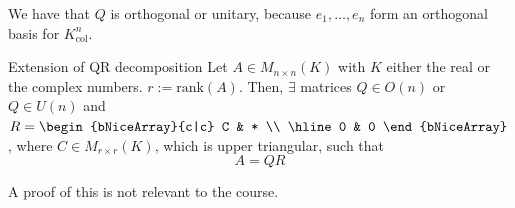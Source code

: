 \documentclass[12pt]{article}
\begin{document}
\begin{proofbox}
    We have that $Q$ is orthogonal or unitary, because $e_1,\dots,e_n$ form an orthogonal basis for $K_\text{col}^n$.
\end{proofbox}

\begin{notebox}{Extension of QR decomposition}{}
    Let $A \in M_{n \times n}(K)$ with $K$ either the real or the complex numbers. $r := \mathrm{rank}(A)$. Then, $\exists$ matrices $Q \in O(n)$ or $Q \in U(n)$ and $R = \begin{bNiceArray}{c|c}
C & * \\
\hline
0 & 0
\end{bNiceArray}$, where $C \in M_{r \times r}(K)$, which is upper triangular, such that
$$
    A = QR
$$

A proof of this is not relevant to the course.
\end{notebox}
\end{document}
